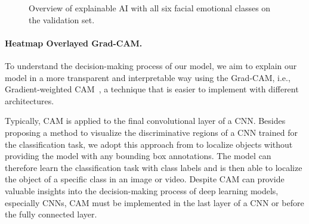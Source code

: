 \begin{figure}[ht]
  \caption{Overview of explainable AI with all six facial emotional classes on the validation set.}
  \label{fig:xai}
\end{figure}

\paragraph{Heatmap Overlayed Grad-CAM.}
To understand the decision-making process of our model, 
we aim to explain our model in a more transparent and interpretable way using the Grad-CAM, 
i.e., Gradient-weighted CAM~\cite{SelvarajuCDVPB17}, 
a technique that is easier to implement with different architectures. 

Typically,
CAM is applied to the final convolutional layer of a CNN. 
Besides proposing a method to visualize the discriminative regions of a CNN trained for the classification task, 
we adopt this approach from \citet{ZhouKLOT16} to localize objects without providing the model with any bounding box annotations. 
The model can therefore learn the classification task with class labels and is then able to localize the object of a specific class in an image or video. 
Despite CAM can provide valuable insights into the decision-making process of deep learning models, 
especially CNNs, 
CAM must be implemented in the last layer of a CNN or before the fully connected layer.

